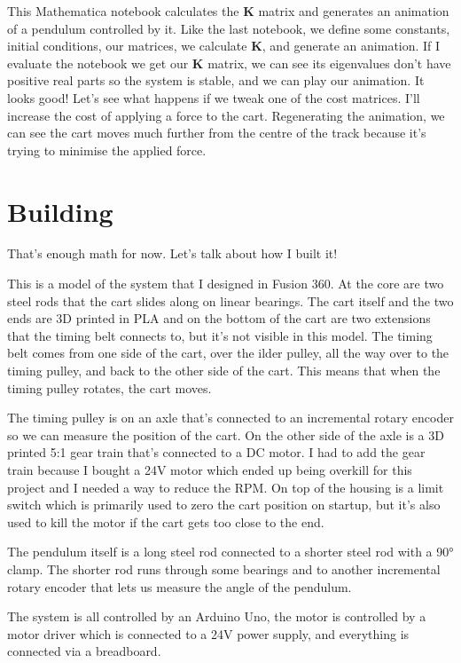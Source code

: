 \documentclass{article}
\renewcommand{\vec}[1]{\boldsymbol{\mathbf{#1}}}
\begin{document}
This Mathematica notebook calculates the $\vec{K}$ matrix and generates an animation of a pendulum controlled by it. Like the last notebook, we define some constants, initial conditions, our matrices, we calculate $\vec{K}$, and generate an animation. If I evaluate the notebook we get our $\vec{K}$ matrix, we can see its eigenvalues don't have positive real parts so the system is stable, and we can play our animation. It looks good! Let's see what happens if we tweak one of the cost matrices. I'll increase the cost of applying a force to the cart. Regenerating the animation, we can see the cart moves much further from the centre of the track because it's trying to minimise the applied force.

\section{Building}

That's enough math for now. Let's talk about how I built it!

This is a model of the system that I designed in Fusion 360. At the core are two steel rods that the cart slides along on linear bearings. The cart itself and the two ends are 3D printed in PLA and on the bottom of the cart are two extensions that the timing belt connects to, but it's not visible in this model. The timing belt comes from one side of the cart, over the ilder pulley, all the way over to the timing pulley, and back to the other side of the cart. This means that when the timing pulley rotates, the cart moves.

The timing pulley is on an axle that's connected to an incremental rotary encoder so we can measure the position of the cart. On the other side of the axle is a 3D printed 5:1 gear train that's connected to a DC motor. I had to add the gear train because I bought a 24V motor which ended up being overkill for this project and I needed a way to reduce the RPM. On top of the housing is a limit switch which is primarily used to zero the cart position on startup, but it's also used to kill the motor if the cart gets too close to the end.

The pendulum itself is a long steel rod connected to a shorter steel rod with a 90° clamp. The shorter rod runs through some bearings and to another incremental rotary encoder that lets us measure the angle of the pendulum.

The system is all controlled by an Arduino Uno, the motor is controlled by a motor driver which is connected to a 24V power supply, and everything is connected via a breadboard.
\end{document}
